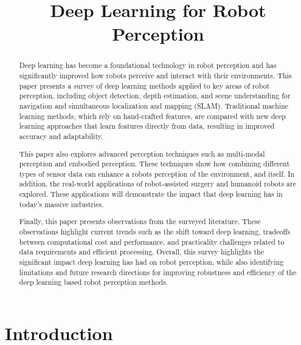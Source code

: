 \documentclass[conference]{IEEEtran}
\title{Deep Learning for Robot Perception}
\author{
\IEEEauthorblockN{Luke Peter}
\IEEEauthorblockA{
University of South Carolina \\
Email: mp79@email.sc.edu
}
}
\begin{document}
\maketitle

\begin{abstract}
Deep learning has become a foundational technology in robot perception and has significantly improved how robots perceive and interact with their environments. This paper presents a survey of deep learning methods applied to key areas of robot perception, including object detection, depth estimation, and scene understanding for navigation and simultaneous localization and mapping (SLAM). Traditional machine learning methods, which rely on hand-crafted features, are compared with new deep learning approaches that learn features directly from data, resulting in improved accuracy and adaptability.\par 
This paper also explores advanced perception techniques such as multi-modal perception and embodied perception. These techniques show how combining different types of sensor data can enhance a robots perception of the environment, and itself. In addition, the real-world applications of robot-assisted surgery and humanoid robots are explored. These applications will demonstrate the impact that deep learning has in today's massive industries. \par
Finally, this paper presents observations from the surveyed literature. These observations highlight current trends such as the shift toward deep learning, tradeoffs between computational cost and performance, and practicality challenges related to data requirements and efficient processing. Overall, this survey highlights the significant impact deep learning has had on robot perception, while also identifying limitations and future research directions for improving robustness and efficiency of the deep learning based robot perception methods.
\end{abstract}

\section{Introduction}
\end{document}
